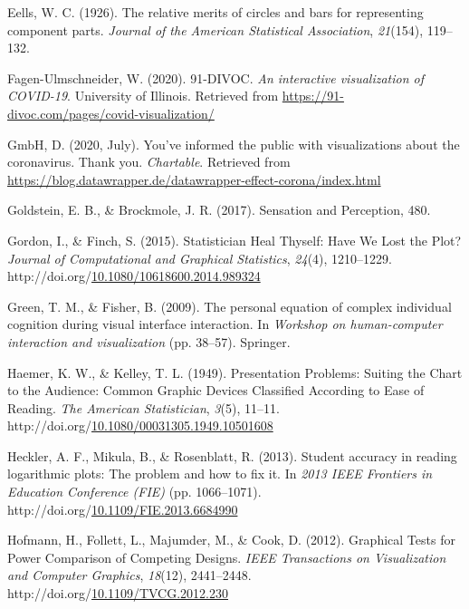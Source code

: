\documentclass[print]{nuthesis}
\newlength{\cslhangindent}
\newenvironment{CSLReferences}%
{\setlength{\parindent}{0pt}%
\everypar{\setlength{\hangindent}{\cslhangindent}}\ignorespaces}%
{\par}
\begin{document}
\begin{CSLReferences}{1}{0}
\leavevmode\hypertarget{ref-eells1926relative}{}%
Eells, W. C. (1926). The relative merits of circles and bars for representing component parts. \emph{Journal of the American Statistical Association}, \emph{21}(154), 119--132.

\leavevmode\hypertarget{ref-fagen-ulmschneider_2020}{}%
Fagen-Ulmschneider, W. (2020). 91-DIVOC. \emph{An interactive visualization of COVID-19}. University of Illinois. Retrieved from \url{https://91-divoc.com/pages/covid-visualization/}

\leavevmode\hypertarget{ref-gmbh_youve_2020}{}%
GmbH, D. (2020, July). You've informed the public with visualizations about the coronavirus. {Thank} you. \emph{Chartable}. Retrieved from \url{https://blog.datawrapper.de/datawrapper-effect-corona/index.html}

\leavevmode\hypertarget{ref-goldstein_sensation_2017}{}%
Goldstein, E. B., \& Brockmole, J. R. (2017). Sensation and {Perception}, 480.

\leavevmode\hypertarget{ref-gordon_statistician_2015}{}%
Gordon, I., \& Finch, S. (2015). Statistician {Heal} {Thyself}: {Have} {We} {Lost} the {Plot}? \emph{Journal of Computational and Graphical Statistics}, \emph{24}(4), 1210--1229. http://doi.org/\href{https://doi.org/10.1080/10618600.2014.989324}{10.1080/10618600.2014.989324}

\leavevmode\hypertarget{ref-green2009personal}{}%
Green, T. M., \& Fisher, B. (2009). The personal equation of complex individual cognition during visual interface interaction. In \emph{Workshop on human-computer interaction and visualization} (pp. 38--57). Springer.

\leavevmode\hypertarget{ref-haemer_presentation_1949}{}%
Haemer, K. W., \& Kelley, T. L. (1949). Presentation {Problems}: {Suiting} the {Chart} to the {Audience}: {Common} {Graphic} {Devices} {Classified} {According} to {Ease} of {Reading}. \emph{The American Statistician}, \emph{3}(5), 11--11. http://doi.org/\href{https://doi.org/10.1080/00031305.1949.10501608}{10.1080/00031305.1949.10501608}

\leavevmode\hypertarget{ref-heckler_student_2013}{}%
Heckler, A. F., Mikula, B., \& Rosenblatt, R. (2013). Student accuracy in reading logarithmic plots: {The} problem and how to fix it. In \emph{2013 {IEEE} {Frontiers} in {Education} {Conference} ({FIE})} (pp. 1066--1071). http://doi.org/\href{https://doi.org/10.1109/FIE.2013.6684990}{10.1109/FIE.2013.6684990}

\leavevmode\hypertarget{ref-hofmann_graphical_2012}{}%
Hofmann, H., Follett, L., Majumder, M., \& Cook, D. (2012). Graphical {Tests} for {Power} {Comparison} of {Competing} {Designs}. \emph{IEEE Transactions on Visualization and Computer Graphics}, \emph{18}(12), 2441--2448. http://doi.org/\href{https://doi.org/10.1109/TVCG.2012.230}{10.1109/TVCG.2012.230}


\end{CSLReferences}
\end{document}
